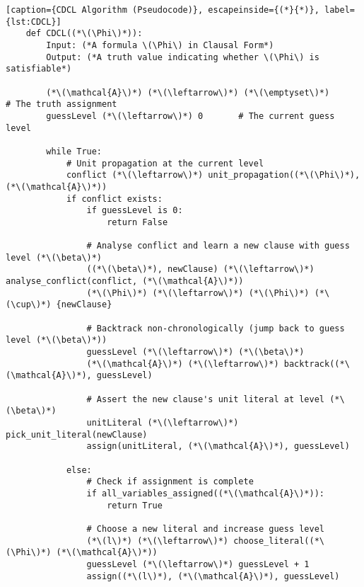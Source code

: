\begin{lstlisting}[caption={CDCL Algorithm (Pseudocode)}, escapeinside={(*}{*)}, label={lst:CDCL}]
    def CDCL((*\(\Phi\)*)):
        Input: (*A formula \(\Phi\) in Clausal Form*)
        Output: (*A truth value indicating whether \(\Phi\) is satisfiable*)

        (*\(\mathcal{A}\)*) (*\(\leftarrow\)*) (*\(\emptyset\)*)               # The truth assignment
        guessLevel (*\(\leftarrow\)*) 0       # The current guess level

        while True:
            # Unit propagation at the current level
            conflict (*\(\leftarrow\)*) unit_propagation((*\(\Phi\)*), (*\(\mathcal{A}\)*))
            if conflict exists:
                if guessLevel is 0:
                    return False
                
                # Analyse conflict and learn a new clause with guess level (*\(\beta\)*)
                ((*\(\beta\)*), newClause) (*\(\leftarrow\)*) analyse_conflict(conflict, (*\(\mathcal{A}\)*))
                (*\(\Phi\)*) (*\(\leftarrow\)*) (*\(\Phi\)*) (*\(\cup\)*) {newClause}

                # Backtrack non-chronologically (jump back to guess level (*\(\beta\)*))
                guessLevel (*\(\leftarrow\)*) (*\(\beta\)*)
                (*\(\mathcal{A}\)*) (*\(\leftarrow\)*) backtrack((*\(\mathcal{A}\)*), guessLevel)

                # Assert the new clause's unit literal at level (*\(\beta\)*)
                unitLiteral (*\(\leftarrow\)*) pick_unit_literal(newClause)
                assign(unitLiteral, (*\(\mathcal{A}\)*), guessLevel)

            else:
                # Check if assignment is complete
                if all_variables_assigned((*\(\mathcal{A}\)*)):
                    return True

                # Choose a new literal and increase guess level
                (*\(l\)*) (*\(\leftarrow\)*) choose_literal((*\(\Phi\)*) (*\(\mathcal{A}\)*))
                guessLevel (*\(\leftarrow\)*) guessLevel + 1
                assign((*\(l\)*), (*\(\mathcal{A}\)*), guessLevel)
\end{lstlisting}

